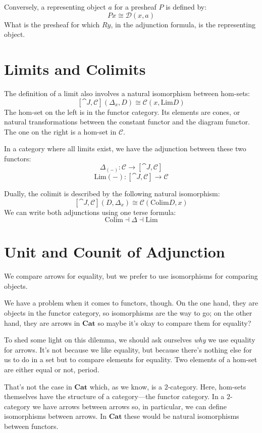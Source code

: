 \documentclass[DaoFP]{subfiles}
\begin{document}
\begin{exercise}
Conversely, a representing object $a$ for a presheaf $P$ is defined by:
\[P x \cong \mathcal{D}(x, a)\]
What is the presheaf for which $R y$, in the adjunction formula, is the representing object.
\end{exercise}

\section{Limits and Colimits}

The definition of a limit also involves a natural isomorphism between hom-sets:
\[ [\cat J, \mathcal{C}](\Delta_x, D)  \cong \mathcal{C}(x, \text{Lim} D) \]
The hom-set on the left is in the functor category. Its elements are cones, or natural transformations between the constant functor and the diagram functor. The one on the right is a hom-set in $\mathcal{C}$. 

In a category where all limits exist, we have the adjunction between these two functors:
\[ \Delta_{(-)} \colon \mathcal{C} \to  [\cat J, \mathcal{C}] \]
\[ \text{Lim}{(-)} \colon  [\cat J, \mathcal{C}] \to \mathcal{C} \]

Dually, the colimit is described by the following natural isomorphism:
\[ [\cat J, \mathcal{C}](D, \Delta_x)  \cong \mathcal{C}( \text{Colim} D, x) \]
We can write both adjunctions using one terse formula:
\[ \text{Colim} \dashv \Delta \dashv \text{Lim}\]

\section{Unit and Counit of Adjunction}

We compare arrows for equality, but we prefer to use isomorphisms for comparing objects. 

We have a problem when it comes to functors, though. On the one hand, they are objects in the functor category, so isomorphisms are the way to go; on the other hand, they are arrows in $\mathbf{Cat}$ so maybe it's okay to compare them for equality?

To shed some light on this dilemma, we should ask ourselves \emph{why} we use equality for arrows. It's not because we like equality, but because there's nothing else for us to do in a set but to compare elements for equality. Two elements of a hom-set are either equal or not, period. 

That's not the case in  $\mathbf{Cat}$ which, as we know, is a $2$-category. Here, hom-sets themselves have the structure of a category---the functor category. In a $2$-category we have arrows between arrows so, in particular, we can define isomorphisms between arrows. In $\mathbf{Cat}$ these would be natural isomorphisms between functors.
\end{document}
